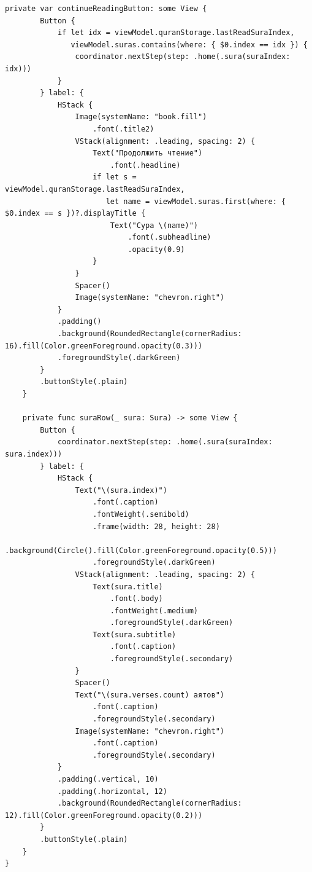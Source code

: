 \begin{lstlisting}[basicstyle=\tiny\ttfamily,breaklines=true]
    private var continueReadingButton: some View {
        Button {
            if let idx = viewModel.quranStorage.lastReadSuraIndex,
               viewModel.suras.contains(where: { $0.index == idx }) {
                coordinator.nextStep(step: .home(.sura(suraIndex: idx)))
            }
        } label: {
            HStack {
                Image(systemName: "book.fill")
                    .font(.title2)
                VStack(alignment: .leading, spacing: 2) {
                    Text("Продолжить чтение")
                        .font(.headline)
                    if let s = viewModel.quranStorage.lastReadSuraIndex,
                       let name = viewModel.suras.first(where: { $0.index == s })?.displayTitle {
                        Text("Сура \(name)")
                            .font(.subheadline)
                            .opacity(0.9)
                    }
                }
                Spacer()
                Image(systemName: "chevron.right")
            }
            .padding()
            .background(RoundedRectangle(cornerRadius: 16).fill(Color.greenForeground.opacity(0.3)))
            .foregroundStyle(.darkGreen)
        }
        .buttonStyle(.plain)
    }

    private func suraRow(_ sura: Sura) -> some View {
        Button {
            coordinator.nextStep(step: .home(.sura(suraIndex: sura.index)))
        } label: {
            HStack {
                Text("\(sura.index)")
                    .font(.caption)
                    .fontWeight(.semibold)
                    .frame(width: 28, height: 28)
                    .background(Circle().fill(Color.greenForeground.opacity(0.5)))
                    .foregroundStyle(.darkGreen)
                VStack(alignment: .leading, spacing: 2) {
                    Text(sura.title)
                        .font(.body)
                        .fontWeight(.medium)
                        .foregroundStyle(.darkGreen)
                    Text(sura.subtitle)
                        .font(.caption)
                        .foregroundStyle(.secondary)
                }
                Spacer()
                Text("\(sura.verses.count) аятов")
                    .font(.caption)
                    .foregroundStyle(.secondary)
                Image(systemName: "chevron.right")
                    .font(.caption)
                    .foregroundStyle(.secondary)
            }
            .padding(.vertical, 10)
            .padding(.horizontal, 12)
            .background(RoundedRectangle(cornerRadius: 12).fill(Color.greenForeground.opacity(0.2)))
        }
        .buttonStyle(.plain)
    }
}
\end{lstlisting}

